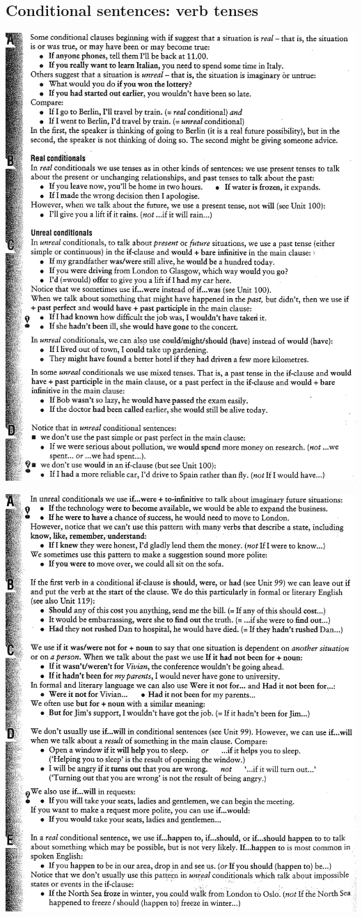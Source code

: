 \subsection{Conditional sentences: verb tenses}
\includegraphics[scale=.85]{handouts/Eng105.jpg}

\includegraphics[scale=.85]{handouts/Eng106.jpg}
